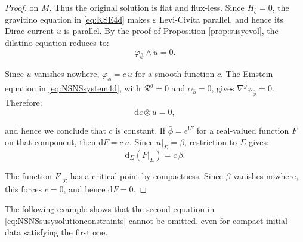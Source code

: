\documentclass[10pt,reqno,a4paper]{amsart}
\theoremstyle{plain}
\theoremstyle{definition}
\theoremstyle{remark}
\theoremstyle{remark}
\def\dd{\mathrm{d}}
\def\cR{{\mathcal R}}
\renewcommand{\(}{ (}
\renewcommand{\)}{ )}
\begin{document}
\begin{proof}
\noindent
on $M$. Thus the original solution is flat and flux-less. Since $H_{\bar b}=0$, the gravitino equation in \eqref{eq:KSE4d} makes $\varepsilon$ Levi-Civita parallel, and hence its Dirac current $u$ is parallel. By the proof of Proposition \ref{prop:susyevol}, the dilatino equation reduces to:
\begin{equation*}
\varphi_{\bar{\phi}}\wedge u=0.
\end{equation*}
	
\noindent
Since $u$ vanishes nowhere, $\varphi_{\bar{\phi}}=c\,u$ for a smooth function $c$. The Einstein equation in \eqref{eq:NSNSsystem4d}, with $\cR^g=0$ and $\alpha_{\bar b}=0$, gives $\nabla^g\varphi_{\bar{\phi}}=0$. Therefore:
\begin{equation*}
\dd c\otimes u=0,
\end{equation*}
	
\noindent
and hence we conclude that $c$ is constant. If $\bar{\phi}=e^{\mathrm{i}F}$ for a real-valued function $F$ on that component, then $\dd F=c\,u$. Since $u\vert_{\Sigma}=\beta$, restriction to $\Sigma$ gives:
\begin{equation*}
\dd_{\Sigma}(F\vert_{\Sigma})=c\,\beta.
\end{equation*}
	
\noindent
The function $F\vert_{\Sigma}$ has a critical point by compactness. Since $\beta$ vanishes nowhere, this forces $c=0$, and hence $\dd F=0$.  
\end{proof}


\noindent
The following example shows that the second equation in \eqref{eq:NSNSsusysolutionconstraints} cannot be omitted, even for compact initial data satisfying the first one.
\end{document}
